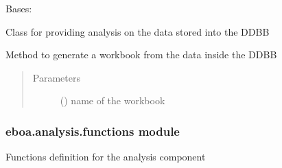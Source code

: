 \begin{fulllineitems}
\label{\detokenize{eboa.analysis:eboa.analysis.analysis.Analysis}}
Bases: 

Class for providing analysis on the data stored into the DDBB

\begin{fulllineitems}
\label{\detokenize{eboa.analysis:eboa.analysis.analysis.Analysis.adjust_column_width}}
\end{fulllineitems}


\begin{fulllineitems}
\label{\detokenize{eboa.analysis:eboa.analysis.analysis.Analysis.generate_workbook_from_ddbb}}
Method to generate a workbook from the data inside the DDBB
\begin{quote}\begin{description}
\item[{Parameters}] \leavevmode
{} () \textendash{} name of the workbook

\end{description}\end{quote}

\end{fulllineitems}


\end{fulllineitems}



\subsubsection{eboa.analysis.functions module}
\label{\detokenize{eboa.analysis:module-eboa.analysis.functions}}\label{\detokenize{eboa.analysis:eboa-analysis-functions-module}}
Functions definition for the analysis component

